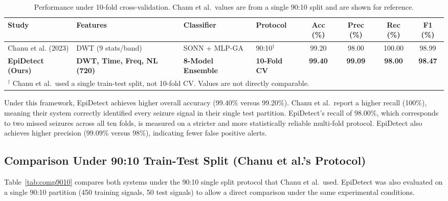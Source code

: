 \begin{table}[htbp]
\centering
\footnotesize
\renewcommand{\arraystretch}{1.5}
\caption{Performance under 10-fold cross-validation. Chanu et al.\ values are from a single 90:10 split and are shown for reference.}
\label{tab:comp10fold}
\begin{tabular}{|p{2.4cm}|p{2.6cm}|p{2.0cm}|p{1.2cm}|c|c|c|c|}
\hline
\textbf{Study} & \textbf{Features} & \textbf{Classifier} & \textbf{Protocol} & \textbf{Acc (\%)} & \textbf{Prec (\%)} & \textbf{Rec (\%)} & \textbf{F1 (\%)} \\
\hline
Chanu et al. (2023) \cite{chanu2023automated} & DWT (9 stats/band) & SONN + MLP-GA & 90:10$^\dagger$ & 99.20 & 98.00 & 100.00 & 98.99 \\
\hline
\textbf{EpiDetect (Ours)} & \textbf{DWT, Time, Freq, NL (720)} & \textbf{8-Model Ensemble} & \textbf{10-Fold CV} & \textbf{99.40} & \textbf{99.09} & \textbf{98.00} & \textbf{98.47} \\
\hline
\multicolumn{8}{l}{\footnotesize $^\dagger$ Chanu et al.\ used a single train-test split, not 10-fold CV. Values are not directly comparable.} \\
\end{tabular}
\end{table}

Under this framework, EpiDetect achieves higher overall accuracy (99.40\% versus 99.20\%). Chanu et al.\ report a higher recall (100\%), meaning their system correctly identified every seizure signal in their single test partition. EpiDetect's recall of 98.00\%, which corresponds to two missed seizures across all ten folds, is measured on a stricter and more statistically reliable multi-fold protocol. EpiDetect also achieves higher precision (99.09\% versus 98\%), indicating fewer false positive alerts.

\subsection{Comparison Under 90:10 Train-Test Split (Chanu et al.'s Protocol)}

Table~\ref{tab:comp9010} compares both systems under the 90:10 single split protocol that Chanu et al.\ used. EpiDetect was also evaluated on a single 90:10 partition (450 training signals, 50 test signals) to allow a direct comparison under the same experimental conditions.

